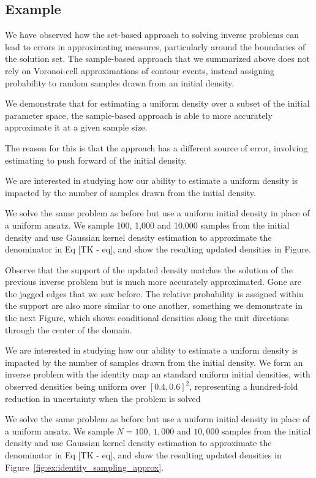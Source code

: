 \subsection{Example}\label{sec:sample-example}

We have observed how the set-based approach to solving inverse problems can lead to errors in approximating measures, particularly around the boundaries of the solution set.
The sample-based approach that we summarized above does not rely on Voronoi-cell approximations of contour events, instead assigning probability to random samples drawn from an initial density.

We demonstrate that for estimating a uniform density over a subset of the initial parameter space, the sample-based approach is able to more accurately approximate it at a given sample size.

The reason for this is that the approach has a different source of error, involving estimating to push forward of the initial density.

We are interested in studying how our ability to estimate a uniform density is impacted by the number of samples drawn from the initial density.

We solve the same problem as before but use a uniform initial density in place of a uniform ansatz.
We sample 100, 1,000 and 10,000 samples from the initial density and use Gaussian kernel density estimation to approximate the denominator in Eq [TK - eq], and show the resulting updated densities in Figure.

Observe that the support of the updated density matches the solution of the previous inverse problem but is much more accurately approximated. Gone are the jagged edges that we saw before. The relative probability is assigned within the support are also more similar to one another, something we demonstrate in the next Figure, which shows conditional densities along the unit directions through the center of the domain.

We are interested in studying how our ability to estimate a uniform density is impacted by the number of samples drawn from the initial density.
We form an inverse problem with the identity map an standard uniform initial densities, with observed densities being uniform over $[0.4, 0.6]^2$, representing a hundred-fold reduction in uncertainty when the problem is solved

We solve the same problem as before but use a uniform initial density in place of a uniform ansatz.
We sample $N=100$, $1,000$ and $10,000$ samples from the initial density and use Gaussian kernel density estimation to approximate the denominator in Eq [TK - eq], and show the resulting updated densities in Figure~\ref{fig:ex:identity_sampling_approx}.

